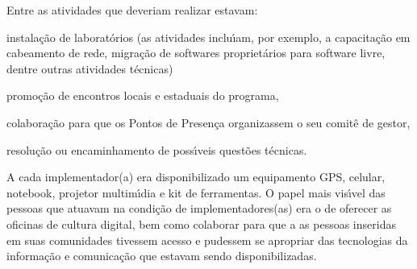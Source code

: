 \documentclass[
12pt,		%
openright,	%
twoside,  %
a4paper,			%
chapter=TITLE,		%
english,			%
french,				%
spanish,			%
brazil				%
]{USPSC-classe/USPSC}
\begin{document}
Entre as atividades que deveriam realizar estavam:











\begin{alineas}
\item instala\c{c}\~ao de laborat\'orios (as atividades inclu\'{\i}am, por exemplo, a capacita\c{c}\~ao em cabeamento de rede, migra\c{c}\~ao de softwares propriet\'arios para software livre, dentre outras atividades t\'ecnicas)
\item promo\c{c}\~ao de encontros locais e estaduais do programa,
\item colabora\c{c}\~ao para que os  Pontos de Presen\c{c}a organizassem o seu comit\^e de gestor,
\item resolu\c{c}\~ao ou encaminhamento de poss\'{\i}veis quest\~oes t\'ecnicas.
\end{alineas}

A cada implementador(a) era disponibilizado um equipamento GPS, celular, notebook, projetor multim\'{\i}dia e kit de ferramentas. O papel mais vis\'{\i}vel das pessoas que atuavam na condi\c{c}\~ao de implementadores(as) era o de oferecer as oficinas de cultura digital, bem como colaborar para que a as pessoas inseridas em suas comunidades tivessem acesso e pudessem se apropriar das tecnologias da informa\c{c}\~ao e comunica\c{c}\~ao que estavam sendo disponibilizadas.











\noindent\begin{center}\mbox{\centering{}}\end{center}
\end{document}
